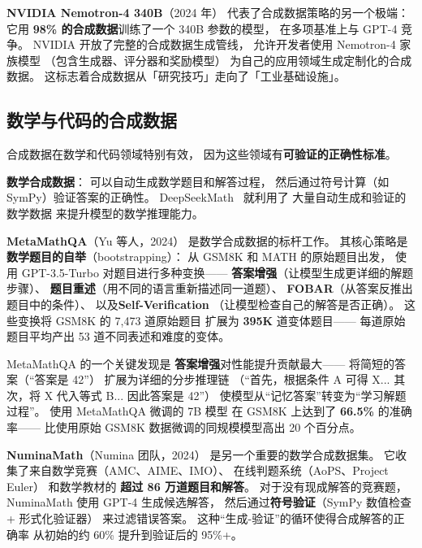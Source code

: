 \textbf{NVIDIA Nemotron-4 340B}（2024 年）
代表了合成数据策略的另一个极端：
它用 \textbf{98\% 的合成数据}训练了一个 340B 参数的模型，
在多项基准上与 GPT-4 竞争。
NVIDIA 开放了完整的合成数据生成管线，
允许开发者使用 Nemotron-4 家族模型
（包含生成器、评分器和奖励模型）
为自己的应用领域生成定制化的合成数据。
这标志着合成数据从「研究技巧」走向了「工业基础设施」。

\subsection{数学与代码的合成数据}

合成数据在数学和代码领域特别有效，
因为这些领域有\textbf{可验证的正确性标准}。

\textbf{数学合成数据}：
可以自动生成数学题目和解答过程，
然后通过符号计算（如 SymPy）验证答案的正确性。
DeepSeekMath~\cite{shao2024grpo} 就利用了
大量自动生成和验证的数学数据
来提升模型的数学推理能力。

\textbf{MetaMathQA}（Yu 等人，2024）%
是数学合成数据的标杆工作。
其核心策略是\textbf{数学题目的自举}（bootstrapping）：
从 GSM8K 和 MATH 的原始题目出发，
使用 GPT-3.5-Turbo 对题目进行多种变换——
\textbf{答案增强}（让模型生成更详细的解题步骤）、
\textbf{题目重述}（用不同的语言重新描述同一道题）、
\textbf{FOBAR}（从答案反推出题目中的条件）、
以及\textbf{Self-Verification}
（让模型检查自己的解答是否正确）。
这些变换将 GSM8K 的 7,473 道原始题目
扩展为 \textbf{395K} 道变体题目——
每道原始题目平均产出 53 道不同表述和难度的变体。

MetaMathQA 的一个关键发现是
\textbf{答案增强}对性能提升贡献最大——
将简短的答案（``答案是 42''）
扩展为详细的分步推理链
（``首先，根据条件 A 可得 X...
其次，将 X 代入等式 B...
因此答案是 42''）
使模型从``记忆答案''转变为``学习解题过程''。
使用 MetaMathQA 微调的 7B 模型
在 GSM8K 上达到了 \textbf{66.5\%} 的准确率——
比使用原始 GSM8K 数据微调的同规模模型高出 20 个百分点。

\textbf{NuminaMath}（Numina 团队，2024）
是另一个重要的数学合成数据集。
它收集了来自数学竞赛（AMC、AIME、IMO）、
在线判题系统（AoPS、Project Euler）
和数学教材的 \textbf{超过 86 万道题目和解答}。
对于没有现成解答的竞赛题，
NuminaMath 使用 GPT-4 生成候选解答，
然后通过\textbf{符号验证}（SymPy 数值检查 + 形式化验证器）
来过滤错误答案。
这种``生成-验证''的循环使得合成解答的正确率
从初始的约 60\% 提升到验证后的 95\%+。

